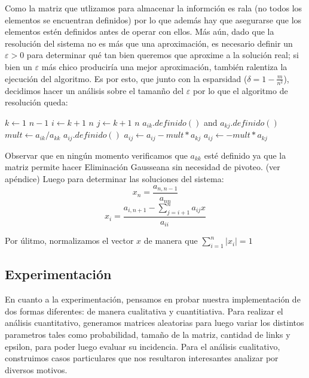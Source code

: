 \par Como la matriz que utlizamos para almacenar la informci\'on es rala (no todos los elementos se encuentran definidos) por lo que 
adem\'as hay que asegurarse que los elementos est\'en definidos antes de operar con ellos. M\'as a\'un, dado que la resoluci\'on
del sistema no es m\'as que una aproximaci\'on, es necesario definir un $\varepsilon > 0$ para determinar qu\'e tan bien queremos que 
aproxime a la soluci\'on real; si bien un $\varepsilon$ m\'as chico producir\'ia una mejor aproximaci\'on, tambi\'en ralentiza la
ejecuci\'on del algoritmo. Es por esto, que junto con la esparsidad ($\delta = 1 - \frac{m}{n^2}$), decidimos hacer un an\'alisis
sobre el taman\~no del $\varepsilon$ por lo que el algoritmo de resoluci\'on queda:

\begin{codebox}\label{elimGaussRala}
\li \For $k \gets 1$ \To $n-1$
    \Do
\li     \For $i \gets k+1$ \To $n$
            \Do
\li         \For $j \gets k+1$ \To $n$
                \Do
\li                \If $a_{ik}.definido()$ and $a_{kj}.definido()$
                        \Then
\li                        $mult \gets a_{ik}/a_{kk}$
\li                     \If $a_{ij}.definido()$
                            \Then
\li                          $a_{ij} \gets a_{ij} - mult*a_{kj}$
\li                     \Else
\li                          $a_{ij} \gets - mult*a_{kj}$
                \End
            \End
        \End
\end{codebox}
Observar que en ning\'un momento verificamos que $a_{kk}$ est\'e definido ya que la matriz permite hacer Eliminación Gausseana sin necesidad
de pivoteo. (ver ap\'endice)
Luego para determinar las soluciones del sistema\cite{burden}:
\[
    x_n = \frac{a_{n,n-1}}{a_{nn}}
    \]
    \[
    x_i = \frac {a_{i,n+1} - \sum_{j=i+1}^{n} a_{ij}x} {a_{ii}}
    \]

Por \'ulitmo, normalizamos el vector $x$ de manera que $\sum^{n}_{i=1} |x_i| = 1$
\subsection*{Experimentaci\'on}
\par
En cuanto a la experimentaci\'on, pensamos en probar nuestra implementaci\'on de dos formas diferentes: de manera cualitativa y cuantitiativa.
Para realizar el an\'alisis cuantitativo, generamos matrices aleatorias para luego variar los distintos parametros tales como probabilidad, 
tamaño de la matriz, cantidad de links y epsilon, para poder luego evaluar su incidencia. Para el an\'alisis cualitativo, construimos casos particulares
que nos resultaron interesantes analizar por diversos motivos.

